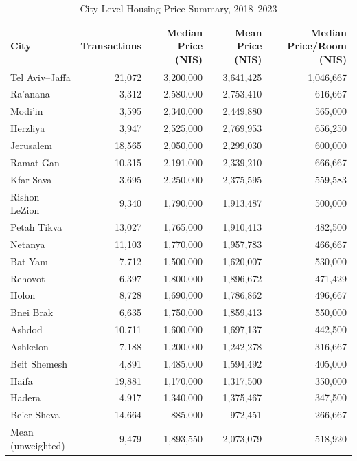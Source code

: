\documentclass[12pt,a4paper]{article}
\begin{document}
\begin{table}[H]
\centering
\caption{City-Level Housing Price Summary, 2018--2023}
\label{tab:housing}
\small
\begin{tabular}{lrrrr}
\toprule
City & Transactions & Median Price (NIS) & Mean Price (NIS) & Median Price/Room (NIS) \\
\midrule
Tel Aviv--Jaffa       & 21,072 & 3,200,000 & 3,641,425 & 1,046,667 \\
Ra'anana              &  3,312 & 2,580,000 & 2,753,410 &   616,667 \\
Modi'in               &  3,595 & 2,340,000 & 2,449,880 &   565,000 \\
Herzliya              &  3,947 & 2,525,000 & 2,769,953 &   656,250 \\
Jerusalem             & 18,565 & 2,050,000 & 2,299,030 &   600,000 \\
Ramat Gan             & 10,315 & 2,191,000 & 2,339,210 &   666,667 \\
Kfar Sava             &  3,695 & 2,250,000 & 2,375,595 &   559,583 \\
Rishon LeZion         &  9,340 & 1,790,000 & 1,913,487 &   500,000 \\
Petah Tikva           & 13,027 & 1,765,000 & 1,910,413 &   482,500 \\
Netanya               & 11,103 & 1,770,000 & 1,957,783 &   466,667 \\
Bat Yam               &  7,712 & 1,500,000 & 1,620,007 &   530,000 \\
Rehovot               &  6,397 & 1,800,000 & 1,896,672 &   471,429 \\
Holon                 &  8,728 & 1,690,000 & 1,786,862 &   496,667 \\
Bnei Brak             &  6,635 & 1,750,000 & 1,859,413 &   550,000 \\
Ashdod                & 10,711 & 1,600,000 & 1,697,137 &   442,500 \\
Ashkelon              &  7,188 & 1,200,000 & 1,242,278 &   316,667 \\
Beit Shemesh          &  4,891 & 1,485,000 & 1,594,492 &   405,000 \\
Haifa                 & 19,881 & 1,170,000 & 1,317,500 &   350,000 \\
Hadera                &  4,917 & 1,340,000 & 1,375,467 &   347,500 \\
Be'er Sheva           & 14,664 &   885,000 &   972,451 &   266,667 \\
\midrule
Mean (unweighted)     &  9,479 & 1,893,550 & 2,073,079 &   518,920 \\
\bottomrule
\end{tabular}
\end{table}
\end{document}

